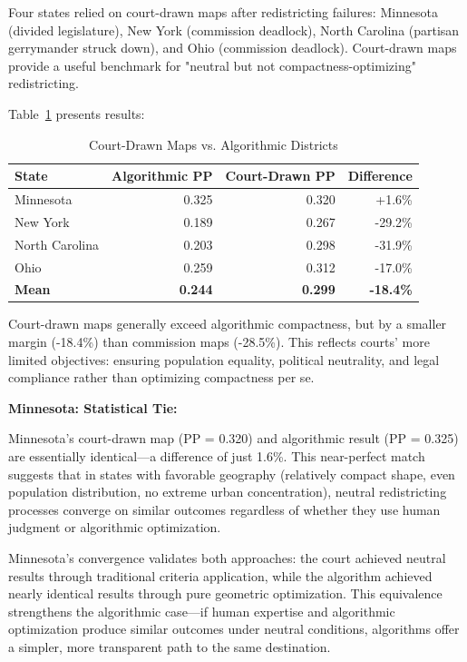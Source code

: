 Four states relied on court-drawn maps after redistricting failures: Minnesota (divided legislature), New York (commission deadlock), North Carolina (partisan gerrymander struck down), and Ohio (commission deadlock). Court-drawn maps provide a useful benchmark for "neutral but not compactness-optimizing" redistricting.

Table~\ref{tab:court_comparison} presents results:

\begin{table}[h]
\centering
\caption{Court-Drawn Maps vs. Algorithmic Districts}
\label{tab:court_comparison}
\begin{tabular}{lrrr}
\toprule
\textbf{State} & \textbf{Algorithmic PP} & \textbf{Court-Drawn PP} & \textbf{Difference} \\
\midrule
Minnesota & 0.325 & 0.320 & +1.6\% \\
New York & 0.189 & 0.267 & -29.2\% \\
North Carolina & 0.203 & 0.298 & -31.9\% \\
Ohio & 0.259 & 0.312 & -17.0\% \\
\midrule
\textbf{Mean} & \textbf{0.244} & \textbf{0.299} & \textbf{-18.4\%} \\
\bottomrule
\end{tabular}
\end{table}

Court-drawn maps generally exceed algorithmic compactness, but by a smaller margin (-18.4\%) than commission maps (-28.5\%). This reflects courts' more limited objectives: ensuring population equality, political neutrality, and legal compliance rather than optimizing compactness per se.

\textbf{Minnesota: Statistical Tie:}

Minnesota's court-drawn map (PP = 0.320) and algorithmic result (PP = 0.325) are essentially identical—a difference of just 1.6\%. This near-perfect match suggests that in states with favorable geography (relatively compact shape, even population distribution, no extreme urban concentration), neutral redistricting processes converge on similar outcomes regardless of whether they use human judgment or algorithmic optimization.

Minnesota's convergence validates both approaches: the court achieved neutral results through traditional criteria application, while the algorithm achieved nearly identical results through pure geometric optimization. This equivalence strengthens the algorithmic case—if human expertise and algorithmic optimization produce similar outcomes under neutral conditions, algorithms offer a simpler, more transparent path to the same destination.

